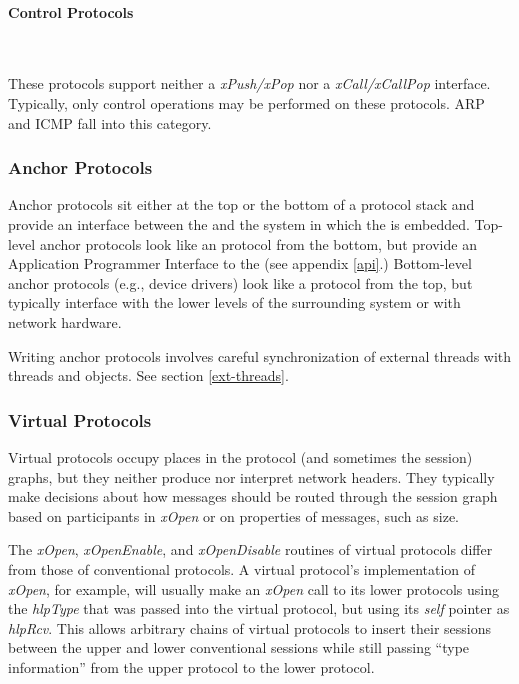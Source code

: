 \paragraph{Control Protocols}{\ }

\smallskip

\noindent These protocols support neither a {\em xPush/xPop} nor a 
{\em xCall/xCallPop} interface.  Typically, only control operations
may be performed on these protocols.  ARP and ICMP fall into this
category.


\subsubsection{Anchor Protocols}

Anchor protocols sit either at the top or the bottom of a protocol
stack and provide an interface between the \xk{} and the system in
which the \xk{} is embedded.  Top-level anchor protocols look like an
\xk{} protocol from the bottom, but provide an Application Programmer
Interface to the \xk{} (see appendix \ref{api}.)  Bottom-level anchor
protocols (e.g., device drivers) look like a protocol from the top,
but typically interface with the lower levels of the surrounding
system or with network hardware.

Writing anchor protocols involves careful synchronization of
external threads with \xk{} threads and objects.  See section
\ref{ext-threads}. 

\subsubsection{Virtual Protocols}

Virtual protocols occupy places in the protocol (and sometimes the
session) graphs, but they neither produce nor interpret network headers.
They typically make decisions about how messages should be routed
through the session graph based on participants in {\em xOpen} or on
properties of messages, such as size.

The {\em xOpen}, {\em xOpenEnable}, and {\em xOpenDisable} routines of
virtual protocols differ from those of conventional protocols.  A
virtual protocol's implementation of {\em xOpen}, for example, will
usually make an {\em xOpen} call to its lower protocols using the {\em
hlpType} that was passed into the virtual protocol, but using its {\em
self} pointer as {\em hlpRcv}.  This allows arbitrary chains of
virtual protocols to insert their sessions between the upper and lower
conventional sessions while still passing ``type information'' from
the upper protocol to the lower protocol.


